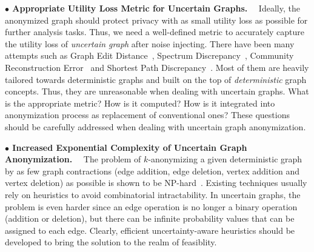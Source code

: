 \vspace{2mm}\hspace{-1em}
\textbf{$\bullet$ Appropriate Utility Loss Metric for Uncertain Graphs.}~~
Ideally, the anonymized graph should protect privacy with
as small utility loss as possible for further analysis tasks. Thus, we need a well-defined metric to accurately capture the utility loss of \emph{uncertain graph} after noise injecting. 
There have been many attempts such as Graph Edit Distance~\cite{Liu_Towards_2008}, Spectrum Discrepancy~\cite{Ying_Randomizing_2008}, Community Reconstruction Error~\cite{Wang2011} and Shortest Path Discrepancy~\cite{Liu_Privacy_2009}.  Most of them are heavily tailored towards deterministic graphs and built on the top of \emph{deterministic} graph concepts. Thus, they are unreasonable when dealing with uncertain graphs. What is the appropriate metric? How is it computed? How is it integrated into anonymization process as replacement of conventional ones? These questions should be carefully addressed when dealing with uncertain graph anonymization. 

\vspace{2mm}\hspace{-1em}
\textbf{$\bullet$ Increased Exponential Complexity of Uncertain Graph Anonymization.}~~
The problem of $k$-anonymizing a given deterministic graph by as few graph contractions (edge addition, edge deletion, vertex addition and vertex deletion) as possible is shown to be NP-hard~\cite{Hartung_Theory_2015}. Existing techniques usually rely on heuristics to avoid combinatorial
intractability. In uncertain graphs, the problem is even harder since an edge operation is no longer a binary operation (addition or deletion), but there can be infinite probability values that can be assigned to each edge. Clearly, efficient uncertainty-aware heuristics should be developed to bring the solution to the realm of feasiblity. 



